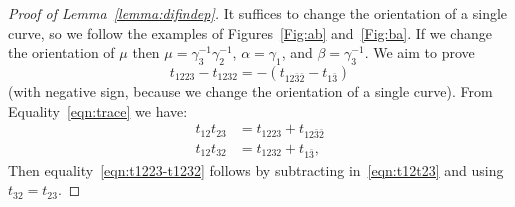 \begin{proof}[Proof of Lemma~\ref{lemma:difindep}]
It suffices to change the orientation of a single curve, so we follow the examples of Figures~\ref{Fig:ab} and~\ref{Fig:ba}. If we change the orientation of $\mu$ then $\mu=\gamma_3^{-1}\gamma_2^{-1}$, $\alpha= \gamma_1$, and $\beta= \gamma_3^{-1}$. We aim to prove
\begin{equation}\label{eqn:t1223-t1232}
t_{1223}-t_{1232}= - (t_{12\bar3\bar2}-t_{1\bar 3})
\end{equation}
(with negative sign, because we change the orientation of a single curve). From Equality~\eqref{eqn:trace} we have:
\begin{equation}\label{eqn:t12t23}
\begin{aligned}
t_{12}t_{23} & = t_{1223}+t_{12\bar3\bar2} \\
t_{12}t_{32} & = t_{1232}+ t_{1\bar 3},
\end{aligned}
\end{equation}
Then equality~\eqref{eqn:t1223-t1232} follows by subtracting in~\eqref{eqn:t12t23} and using $t_{32}=t_{23}$.
\end{proof}

